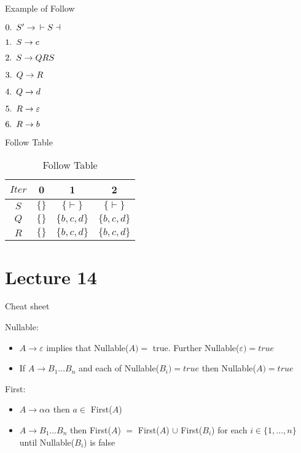 \documentclass{article}
\begin{document}
Example of Follow

\(0. \mkern9muS' \to\mkern9mu \vdash S \dashv\)

\(1. \mkern9muS \to c\)

\(2.\mkern9mu S\to QRS\)

\(3. \mkern9muQ \to R\)

\(4. \mkern9mu Q \to d\)

\(5.\mkern9mu R \to \varepsilon\)

\(6. \mkern9muR \to b\)

Follow Table

\begin{table}[h]
    \centering
    \begin{tabular}{|c|c|c|c|} \hline 
        $Iter$ & 0 & 1 & 2\\ \hline 
        $S$ & $\{\}$ & $\{\vdash\}$ & $\{\vdash\}$\\ \hline 
        $Q$ & $\{\}$ & $\{b,c,d\}$ &$ \{b,c,d\}$ \\ \hline 
        $R$ & $\{\}$ & $\{b,c,d\}$ & $\{b,c,d\}$\\ \hline
    \end{tabular}
    \caption{Follow Table}
    
\end{table}


\section{Lecture 14}\label{lecture-14}

Cheat sheet

Nullable: 

\begin{itemize}
    \item \(A \to \varepsilon\) implies that Nullable(\(A) =\) true. Further Nullable(\(\varepsilon) = true\)
    \item If \(A \to B_1 \ldots B_n\) and each of Nullable(\(B_i) = true\) then Nullable(\(A) = true\)
\end{itemize}


First: 
\begin{itemize}
    \item \(A \to \alpha \alpha\) then \(a \in\) First(\(A\))
    \item \(A \to B_1 \ldots B_n\) then First(\(A\)) \(=\) First(\(A\)) \(\cup\)
First(\(B_i\)) for each \(i \in \{1, \ldots, n\}\) until
Nullable(\(B_i\)) is false
\end{itemize}
\end{document}
